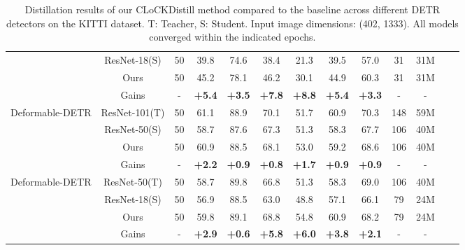 \begin{table*}[h]
\begin{tabular}{lcccccccccccc}
         & ResNet-18(S) & 50 & 39.8 & 74.6 & 38.4 & 21.3 & 39.5 & 57.0 & 31 & 31M\\
         & Ours & 50 & 45.2 & 78.1 & 46.2 & 30.1 & 44.9 & 60.3 & 31 & 31M \\
         & Gains & - & \textbf{+5.4} & \textbf{+3.5} & \textbf{+7.8} & \textbf{+8.8} & \textbf{+5.4} & \textbf{+3.3} & - & - \\
        \midrule
        \multirow{4}{*}{Deformable-DETR} & ResNet-101(T) & 50 & 61.1 & 88.9 & 70.1 & 51.7 & 60.9 & 70.3 & 148 & 59M \\
         & ResNet-50(S) & 50 & 58.7 & 87.6 & 67.3 & 51.3 & 58.3 & 67.7 & 106 & 40M \\
         & Ours & 50 & 60.9 & 88.5 & 68.1 & 53.0 & 59.2 & 68.6 & 106 & 40M \\
         & Gains & - & \textbf{+2.2} & \textbf{+0.9} & \textbf{+0.8} & \textbf{+1.7} & \textbf{+0.9} & \textbf{+0.9} & - & - \\
        \midrule
        \multirow{4}{*}{Deformable-DETR} & ResNet-50(T) & 50 & 58.7 & 89.8 & 66.8 & 51.3 & 58.3 & 69.0 & 106 & 40M \\
         & ResNet-18(S) & 50 & 56.9 & 88.5 & 63.0 & 48.8 & 57.1 & 66.1 & 79 & 24M\\
         & Ours & 50 & 59.8 & 89.1 & 68.8 & 54.8 & 60.9 & 68.2 & 79 & 24M \\
         & Gains & - & \textbf{+2.9} & \textbf{+0.6} & \textbf{+5.8} & \textbf{+6.0} & \textbf{+3.8} & \textbf{+2.1} & - & - \\
        \bottomrule
    \end{tabular}
    \caption{Distillation results of our CLoCKDistill method compared to the baseline across different DETR detectors on the KITTI dataset. T: Teacher, S: Student. Input image dimensions: (402, 1333). All models converged within the indicated epochs.}
    \label{tab:KITTI}
    \vspace{0.2in}
\end{table*}




